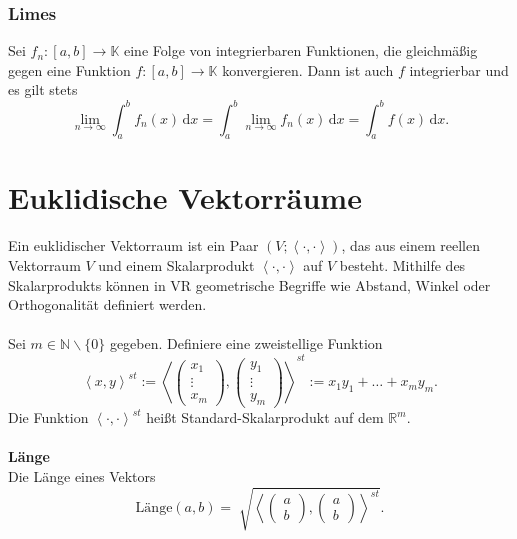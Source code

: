 \documentclass[a4paper,12pt]{article}
\newcommand{\td}{\,\text{d}}
\numberwithin{equation}{section}
\begin{document}
\subsubsection{Limes}
Sei $f_n:[a,b]\rightarrow \mathbb{K}$ eine Folge von integrierbaren Funktionen, die gleichmäßig gegen eine Funktion $f:[a,b]\rightarrow \mathbb{K}$ konvergieren. Dann ist auch $f$ integrierbar und es gilt stets
\[ 
        \lim_{n\rightarrow \infty}\int_{a}^{b}f_n\left(x\right)\td x=\int_{a}^{b}\lim_{n\rightarrow \infty}f_n\left(x\right)\td x=\int_{a}^{b}f\left(x\right)\td x
.\] 

\section{Euklidische Vektorräume}
Ein euklidischer Vektorraum ist ein Paar $\left(V;\left\langle \cdot ,\cdot \right\rangle \right)$, das aus einem reellen Vektorraum $V$ und einem Skalarprodukt $\left\langle \cdot ,\cdot \right\rangle $ auf $V$ besteht. Mithilfe des Skalarprodukts können in VR geometrische Begriffe wie Abstand, Winkel oder Orthogonalität definiert werden.\\\\
Sei $m \in \mathbb{N}\backslash \{0\}$ gegeben. Definiere eine zweistellige Funktion 
\[
        \left\langle x,y\right\rangle ^{s t}:=\left\langle \left(\begin{matrix}
        x_1\\\vdots \\x_m
\end{matrix}\right),\left(\begin{matrix}
        y_1\\\vdots \\y_m
\end{matrix}\right)\right\rangle ^{s t}:=x_1y_1+\hdots +x_my_m
.\]
Die Funktion $\left\langle \cdot ,\cdot \right\rangle ^{s t}$ heißt Standard-Skalarprodukt auf dem $\mathbb{R}^{m}$.
\\\hfill\\\textbf{Länge}\\ 
Die Länge eines Vektors
\[ 
        \text{Länge}\left(a,b\right)=\sqrt[]{\left\langle \left(\begin{matrix}
                a\\b
        \end{matrix}\right),\left(\begin{matrix}
                a\\b
        \end{matrix}\right)\right\rangle ^{s t}}
.\] 
\end{document}
